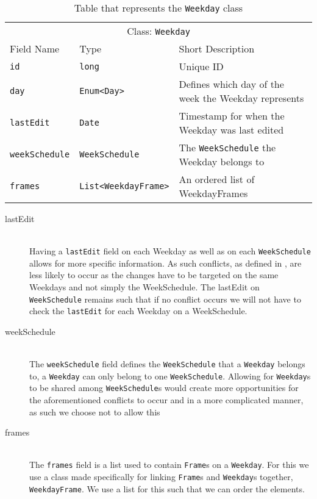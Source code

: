 \begin{table}[]
\centering
\caption{Table that represents the \texttt{Weekday} class}
\label{tbl:Weekday}
\begin{tabular}{lll}
\multicolumn{3}{c}{Class: \texttt{Weekday}}                                                                                    \\
Field Name            & Type                                            & Short Description                                    \\
\texttt{id}           & \texttt{long}                                   & Unique ID                                            \\
\texttt{day}          & \texttt{Enum\textless Day\textgreater}          & Defines which day of the week the Weekday represents \\
\texttt{lastEdit}     & \texttt{Date}                                   & Timestamp for when the Weekday was last edited       \\
\texttt{weekSchedule} & \texttt{WeekSchedule}                           & The \texttt{WeekSchedule} the Weekday belongs to     \\
\texttt{frames}       & \texttt{List\textless WeekdayFrame\textgreater} & An ordered list of WeekdayFrames 
\end{tabular}
\end{table}

\begin{description}
    \item [lastEdit] \hfill \\
    Having a \texttt{lastEdit} field on each Weekday as well as on each \texttt{WeekSchedule} allows for more specific information. 
    As such conflicts, as defined in , are less likely to occur as the changes have to be targeted on the same Weekdays and not simply the WeekSchedule. 
    The lastEdit on \texttt{WeekSchedule} remains such that if no conflict occurs we will not have to check the \texttt{lastEdit} for each Weekday on a WeekSchedule.
    \item [weekSchedule] \hfill \\
    The \texttt{weekSchedule} field defines the \texttt{WeekSchedule} that a \texttt{Weekday} belongs to, a \texttt{Weekday} can only belong to one \texttt{WeekSchedule}.
    Allowing for \texttt{Weekday}s to be shared among \texttt{WeekSchedule}s would create more opportunities for the aforementioned conflicts to occur and in a more complicated manner, as such we choose not to allow this
    \item [frames] \hfill \\
    The \texttt{frames} field is a list used to contain \texttt{Frame}s on a \texttt{Weekday}.
    For this we use a class made specifically for linking \texttt{Frame}s and \texttt{Weekday}s together, \texttt{WeekdayFrame}.
    We use a list for this such that we can order the elements.
\end{description}

